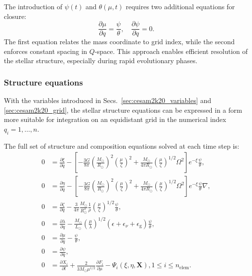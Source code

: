 \documentclass[12pt,a4paper]{article}
\newcommand{\mr}{\mathrm}
\newcommand{\pfird}[2][]{\frac{\partial#1}{\partial#2}}
\newcommand{\bvec}[1]{\boldsymbol{#1}}
\begin{document}
The introduction of $\psi(t)$ and $\theta(\mu, t)$ requires two additional equations for closure:
\begin{equation}
  \pfird[\mu]{q} = \frac{\psi}{\theta},\quad \pfird[\psi]{q} = 0.
\end{equation}
The first equation relates the mass coordinate to grid index, while the second enforces constant spacing in $Q$-space. This approach enables efficient resolution of the stellar structure, especially during rapid evolutionary phases.

\subsubsection{Structure equations}
\label{sec:cesam2k20_struct_eq}

With the variables introduced in Secs.~\ref{sec:cesam2k20_variables} and \ref{sec:cesam2k20_grid}, the stellar structure equations can be expressed in a form more suitable for integration on an equidistant grid in the numerical index $q_i = 1, \ldots, n$. 

The full set of structure and composition equations solved at each time step is:
\begin{subequations} \label{eq:cesam2k20_struct_eq}
  \begin{align}
    0 &= \pfird[\xi]{q} - \left[-\frac{3G}{8\pi}\left(\frac{M_\odot}{R_\odot}\right)^2\left(\frac{\mu}{\zeta}\right)^2 + \frac{M_\odot}{4\pi R_\odot}\left(\frac{\mu}{\zeta}\right)^{1/2} \Omega^2\right]e^{-\xi}\frac{\psi}{\theta}, \label{eq:cesam_struct1}\\
    0 &= \pfird[\eta]{q} - \left[-\frac{3G}{8\pi}\left(\frac{M_\odot}{R_\odot}\right)^2\left(\frac{\mu}{\zeta}\right)^2 + \frac{M_\odot}{4\pi R_\odot}\left(\frac{\mu}{\zeta}\right)^{1/2} \Omega^2\right]e^{-\xi}\frac{\psi}{\theta}\nabla, \label{eq:cesam_struct2}\\
    0 &= \pfird[\zeta]{q} - \frac{3}{4\pi}\frac{M_\odot}{R_\odot^3}\frac{1}{\rho}\left(\frac{\mu}{\zeta}\right)^{1/2}\frac{\psi}{\theta}, \label{eq:cesam_struct3}\\
    0 &= \pfird[\lambda]{q} - \frac{M_\odot}{L_\odot}\left(\frac{\mu}{\lambda}\right)^{1/2}(\epsilon  + \epsilon_\nu + \epsilon_\mr{g})\frac{\psi}{\theta}, \label{eq:cesam_struct4}\\
    0 &= \pfird[\mu]{q} - \frac{\psi}{\theta}, \label{eq:cesam_struct5}\\
    0 &= \pfird[\psi]{q}, \label{eq:cesam_struct6}\\
    0 &= \pfird[X_i]{t} + \frac{2}{3 M_\odot\mu^{1/2}}\pfird[F_i]{\mu} - \Psi_i(\xi, \eta, \bvec{X}), 1\leq i \leq n_\mr{elem}. \label{eq:cesam_struct7}
  \end{align}
\end{subequations}
\end{document}
